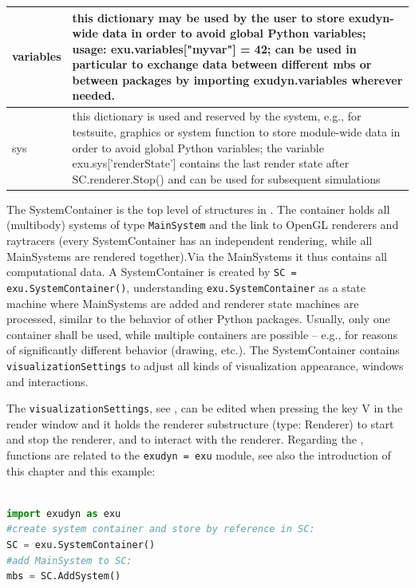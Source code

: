 \begin{center}
\begin{longtable}{| p{8cm} | p{8cm} |}
  variables & this dictionary may be used by the user to store exudyn-wide data in order to avoid global Python variables; usage: exu.variables["myvar"] = 42; can be used in particular to exchange data between different mbs or between packages by importing exudyn.variables wherever needed.\\ \hline  
  sys & this dictionary is used and reserved by the system, e.g., for testsuite, graphics or system function to store module-wide data in order to avoid global Python variables; the variable exu.sys['renderState'] contains the last render state after SC.renderer.Stop() and can be used for subsequent simulations \\ \hline  
\end{longtable}
\end{center}

The SystemContainer is the top level of structures in \codeName. The container holds all (multibody) systems of type \texttt{MainSystem} and the link to OpenGL renderers and raytracers (every SystemContainer has an independent rendering, while all MainSystems are rendered together).Via the MainSystems it thus contains all computational data. A SystemContainer is created by \texttt{SC = exu.SystemContainer()}, understanding \texttt{exu.SystemContainer} as a state machine where MainSystems are added and renderer state machines are processed, similar to the behavior of other Python packages. Usually, only one container shall be used, while multiple containers are possible -- e.g., for reasons of significantly different behavior (drawing, etc.). The SystemContainer contains \texttt{visualizationSettings} to adjust all kinds of visualization appearance, windows and interactions.


The \texttt{visualizationSettings}, see , can be edited when pressing the key V in the render window and it holds the renderer substructure (type: Renderer) to start and stop the renderer, and to interact with the renderer. Regarding the , functions are related to the \texttt{exudyn = exu} module, see also the introduction of this chapter and this example:
\pythonstyle
\begin{lstlisting}[language=Python, firstnumber=1]

import exudyn as exu
#create system container and store by reference in SC:
SC = exu.SystemContainer() 
#add MainSystem to SC:
mbs = SC.AddSystem()
\end{lstlisting}

